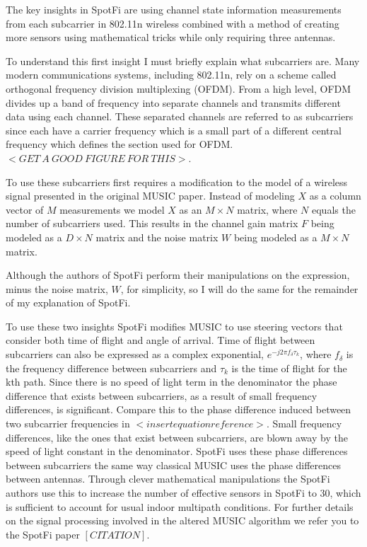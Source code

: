 \documentclass[12pt]{report}
\begin{document}
The key insights in SpotFi are using channel state information measurements from each subcarrier in 802.11n wireless combined with a method of creating more sensors using mathematical tricks while only requiring three antennas. \par

To understand this first insight I must briefly explain what subcarriers are. Many modern communications systems, including 802.11n, rely on a scheme called orthogonal frequency division multiplexing (OFDM). From a high level, OFDM divides up a band of frequency into separate channels and transmits different data using each channel. These separated channels are referred to as subcarriers since each have a carrier frequency which is a small part of a different central frequency which defines the section used for OFDM.  $<GET \: A \: GOOD \: FIGURE \: FOR \: THIS>$. \par

To use these subcarriers first requires a modification to the model of a wireless signal presented in the original MUSIC paper. Instead of modeling $X$ as a column vector of $M$ measurements we model $X$ as an $M \times N$ matrix, where $N$ equals the number of subcarriers used. This results in the channel gain matrix $F$ being modeled as a $D \times N$ matrix and the noise matrix $W$ being modeled as a $M \times N$ matrix. \par

Although the authors of SpotFi perform their manipulations on the expression, minus the noise matrix, $W$, for simplicity, so I will do the same for the remainder of my explanation of SpotFi. \par



To use these two insights SpotFi modifies MUSIC to use steering vectors that consider both time of flight and angle of arrival. Time of flight between subcarriers can also be expressed as a complex exponential, $e^{-j 2 \pi f_{\delta} \tau_k }$, where $f_{\delta}$ is the frequency difference between subcarriers and $\tau_{k}$ is the time of flight for the kth path. Since there is no speed of light term in the denominator the phase difference that exists between subcarriers, as a result of small frequency differences, is significant. Compare this to the phase difference induced between two subcarrier frequencies in $<insert equation reference>$. Small frequency differences, like the ones that exist between subcarriers, are blown away by the speed of light constant in the denominator. SpotFi uses these phase differences between subcarriers the same way classical MUSIC uses the phase differences between antennas. Through clever mathematical manipulations the SpotFi authors use this to increase the number of effective sensors in SpotFi to 30, which is sufficient to account for usual indoor multipath conditions. For further details on the signal processing involved in the altered MUSIC algorithm we refer you to the SpotFi paper $[CITATION]$. \par
\end{document}
